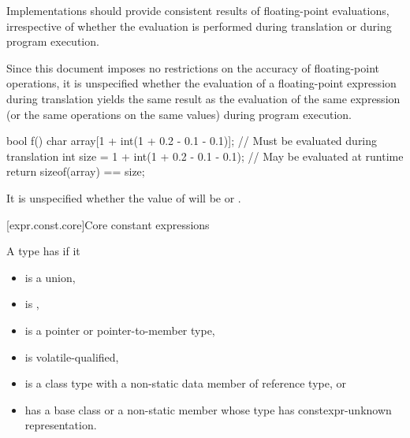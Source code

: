 \pnum
\recommended
Implementations should provide consistent results of floating-point evaluations,
irrespective of whether the evaluation is performed
during translation or during program execution.
\begin{note}
Since this document
imposes no restrictions on the accuracy of floating-point operations, it is unspecified whether the
evaluation of a floating-point expression during translation yields the same result as the
evaluation of the same expression (or the same operations on the same values) during program
execution.
\begin{example}
\begin{codeblock}
bool f() {
    char array[1 + int(1 + 0.2 - 0.1 - 0.1)];   // Must be evaluated during translation
    int size = 1 + int(1 + 0.2 - 0.1 - 0.1);    // May be evaluated at runtime
    return sizeof(array) == size;
}
\end{codeblock}
It is unspecified whether the value of  will be  or .
\end{example}
\end{note}

[expr.const.core]{Core constant expressions}

\pnum
{}%
A type has  if it
\begin{itemize}
\item is a union,
\item is ,
\item is a pointer or pointer-to-member type,
\item is volatile-qualified,
\item is a class type with a non-static data member of reference type, or
\item
has a base class or a non-static member whose
type has constexpr-unknown representation.
\end{itemize}

